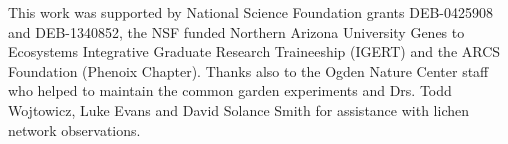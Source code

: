 \documentclass[fleqn,12pt]{olplainarticle}
\begin{document}
This work was supported by National Science Foundation grants
DEB-0425908 and DEB-1340852, the NSF funded Northern Arizona
University Genes to Ecosystems Integrative Graduate Research
Traineeship (IGERT) and the ARCS Foundation (Phenoix Chapter). Thanks
also to the Ogden Nature Center staff who helped to maintain the
common garden experiments and Drs. Todd Wojtowicz, Luke Evans and
David Solance Smith for assistance with lichen network observations.







\end{document}
